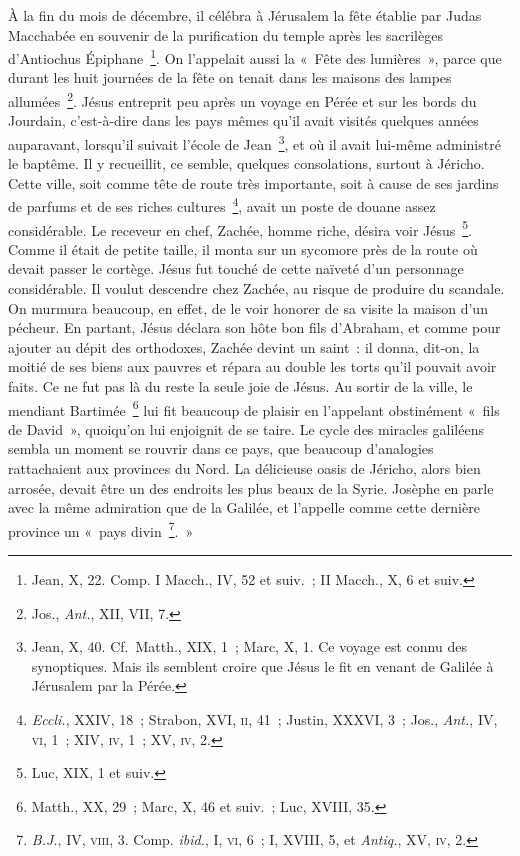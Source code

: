 \documentclass[french,twoside]{book} %
\begin{document}
À la fin du mois de décembre, il célébra à Jérusalem la fête établie par Judas Macchabée en souvenir de la purification du temple après les sacrilèges d’Antiochus Épiphane \footnote{Jean, X, 22. Comp. I Macch., IV, 52 et suiv. ; II Macch., X, 6 et suiv.}. On l’appelait aussi la « Fête des lumières », parce que durant les huit journées de la fête on tenait dans les maisons des lampes allumées \footnote{ Jos., {\itshape Ant.}, XII, VII, 7.}. Jésus entreprit peu après un voyage en Pérée et sur les bords du Jourdain, c’est-à-dire dans les pays mêmes qu’il avait visités quelques années auparavant, lorsqu’il suivait l’école de Jean \footnote{ Jean, X, 40. Cf. Matth., XIX, 1 ; Marc, X, 1. Ce voyage est connu des synoptiques. Mais ils semblent croire que Jésus le fit en venant de Galilée à Jérusalem par la Pérée.}, et où il avait lui-même administré le baptême. Il y recueillit, ce semble, quelques consolations, surtout à Jéricho. Cette ville, soit comme tête de route très importante, soit à cause de ses jardins de parfums et de ses riches cultures \footnote{{\itshape Eccli.}, XXIV, 18 ; Strabon, XVI, \textsc{ii}, 41 ; Justin, XXXVI, 3 ; Jos., {\itshape Ant.}, IV, \textsc{vi}, 1 ; XIV, \textsc{iv}, 1 ; XV, \textsc{iv}, 2.}, avait un poste de douane assez considérable. Le receveur en chef, Zachée, homme riche, désira voir Jésus \footnote{Luc, XIX, 1 et suiv.}. Comme il était de petite taille, il monta sur un sycomore près de la route où devait passer le cortège. Jésus fut touché de cette naïveté d’un personnage considérable. Il voulut descendre chez Zachée, au risque de produire du scandale. On murmura beaucoup, en effet, de le voir honorer de sa visite la maison d’un pécheur. En partant, Jésus déclara son hôte bon fils d’Abraham, et comme pour ajouter au dépit des orthodoxes, Zachée devint un saint : il donna, dit-on, la moitié de ses biens aux pauvres et répara au double les torts qu’il pouvait avoir faits. Ce ne fut pas là du reste la seule joie de Jésus. Au sortir de la ville, le mendiant Bartimée \footnote{Matth., XX, 29 ; Marc, X, 46 et suiv. ; Luc, XVIII, 35.} lui fit beaucoup de plaisir en l’appelant obstinément « fils de David », quoiqu’on lui enjoignit de se taire. Le cycle des miracles galiléens sembla un moment se rouvrir dans ce pays, que beaucoup d’analogies rattachaient aux provinces du Nord. La délicieuse oasis de Jéricho, alors bien arrosée, devait être un des endroits les plus beaux de la Syrie. Josèphe en parle avec la même admiration que de la Galilée, et l’appelle comme cette dernière province un « pays divin \footnote{{\itshape B.J.}, IV, \textsc{viii}, 3. Comp. {\itshape ibid.}, I, \textsc{vi}, 6 ; I, XVIII, 5, et {\itshape Antiq.}, XV, \textsc{iv}, 2.}. »\par
\end{document}
